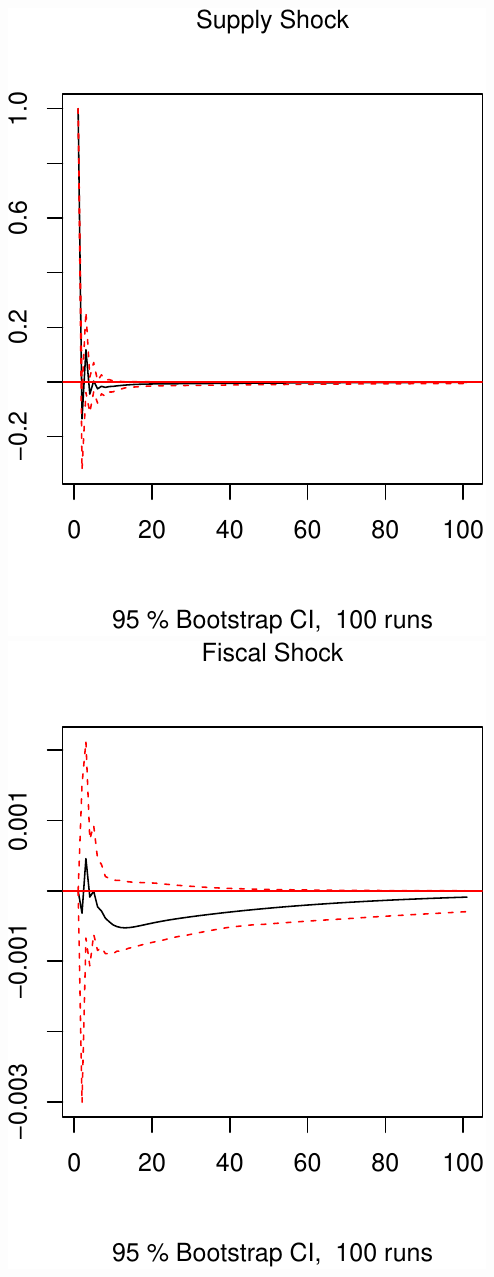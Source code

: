 \documentclass[11pt,preprint, authoryear]{elsarticle}
\numberwithin{equation}{section}
\numberwithin{figure}{section}
\numberwithin{table}{section}
\begin{document}
\includegraphics{TS_proj_files/figure-latex/unnamed-chunk-33-1.pdf}
\includegraphics{TS_proj_files/figure-latex/unnamed-chunk-33-2.pdf}
\end{document}
